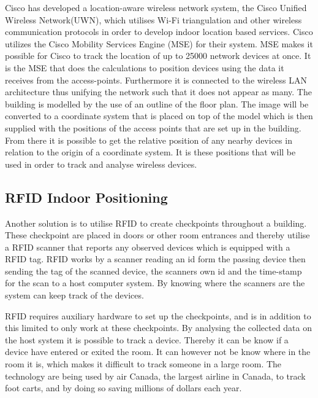 Cisco has developed a location-aware wireless network system, the Cisco Unified Wireless Network(UWN), which utilises Wi-Fi triangulation\cite{CiscoTri} and other wireless communication protocols in order to develop indoor location based services\cite{uwn}.
Cisco utilizes the Cisco Mobility Services Engine (MSE) for their system. MSE makes it possible for Cisco to track the location of up to 25000 network devices at once. It is the MSE that does the calculations to position devices using the data it receives from the access-points. Furthermore it is connected to the wireless LAN architecture thus unifying the network such that it does not appear as many\cite{ciscoMSE}.
The building is modelled by the use of an outline of the floor plan. The image will be converted to a coordinate system that is placed on top of the model which is then supplied with the positions of the access points that are set up in the building. From there it is possible to get the relative position of any nearby devices in relation to the origin of a coordinate system. It is these positions that will be used in order to track and analyse wireless devices.

\subsection{RFID Indoor Positioning}
Another solution is to utilise RFID to create checkpoints throughout a building. These checkpoint are placed in doors or other room entrances and thereby utilise a RFID scanner that reports any observed devices which is equipped with a RFID tag\cite{indoor_bin}. 
RFID works by a scanner reading an id form the passing device then sending the tag of the scanned device, the scanners own id and the time-stamp for the scan to a host computer system. By knowing where the scanners are the system can keep track of the devices\cite{RFIDjournal}.

RFID requires auxiliary hardware to set up the checkpoints, and is in addition to this limited to only work at these checkpoints. By analysing the collected data on the host system it is possible to track a device. Thereby it can be know if a device have entered or exited the room. It can however not be know where in the room it is, which makes it difficult to track someone in a large room.
The technology are being used by air Canada, the largest airline in Canada, to track foot carts, and by doing so saving millions of dollars each year\cite{RFIDjournal}.

